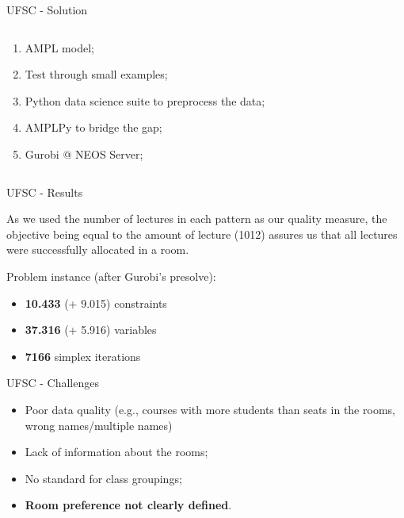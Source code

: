 \documentclass{beamer}
\begin{document}
\begin{frame}{UFSC - Solution}
    
  \begin{columns}[c]
    \begin{column}{.35\textwidth}

	\begin{enumerate}
	    \item AMPL model;
	    \item Test through small examples;
	    \item Python data science suite to preprocess the data;
	    \item AMPLPy to bridge the gap;
	    \item Gurobi @ NEOS Server;
	\end{enumerate}

    \end{column}
    \begin{column}{.65\textwidth}
	
    \end{column}
  \end{columns}
\end{frame}

\begin{frame}{UFSC - Results}

	As we used the number of lectures in each pattern as our quality measure, the objective being equal to the amount of lecture (1012) assures us that all lectures were successfully allocated in a room. \linebreak

    Problem instance (after Gurobi's presolve):
    \begin{itemize}
	\item \textbf{10.433} (+ 9.015) constraints
	\item \textbf{37.316} (+ 5.916) variables
	\item \textbf{7166} simplex iterations
    \end{itemize}
\end{frame}

\begin{frame}{UFSC - Challenges}
    \begin{itemize}
	\item Poor data quality (e.g., courses with more students than seats in the rooms, wrong names/multiple names)
	\item Lack of information about the rooms;
	\item No standard for class groupings;
	\item \textbf{Room preference not clearly defined}.
    \end{itemize}
\end{frame}
\end{document}
